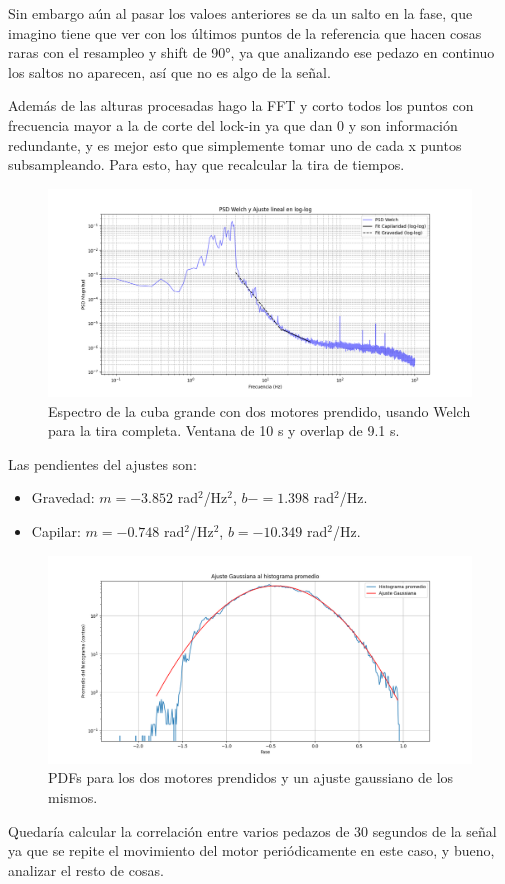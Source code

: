 Sin embargo aún al pasar los valoes anteriores se da un salto en la fase, que imagino tiene que ver con los últimos puntos de la referencia que hacen cosas raras con el resampleo y shift de 90°, ya que analizando ese pedazo en continuo los saltos no aparecen, así que no es algo de la señal. 


Además de las alturas procesadas hago la FFT y corto todos los puntos con frecuencia mayor a la de corte del lock-in ya que dan 0 y son información redundante, y es mejor esto que simplemente tomar uno de cada x puntos subsampleando. Para esto, hay que recalcular la tira de tiempos.

\begin{figure}[th!]
	\centering
	\includegraphics[width=0.87\linewidth]{Figures/23_06_2025/Espectro_dos_motores_cuba_grande}
	\caption{Espectro de la cuba grande con dos motores prendido, usando Welch para la tira completa. Ventana de 10 s y overlap de 9.1 s.}
	\label{fig:espectrodosmotorescubagrande}
\end{figure}

Las pendientes del ajustes son: 
\begin{itemize}
	\item Gravedad: $m=-3.852$ rad$^2$/Hz$^2$, $b-=1.398$ rad$^2$/Hz. 
	\item Capilar: $m=-0.748$ rad$^2$/Hz$^2$, $b=-10.349$ rad$^2$/Hz.
\end{itemize}

\begin{figure}[th!]
	\centering
	\includegraphics[width=0.87\linewidth]{Figures/23_06_2025/PDFS_dos_motores_cuba_grande}
	\caption{PDFs para los dos motores prendidos y un ajuste gaussiano de los mismos.}
	\label{fig:pdfsdosmotorescubagrande}
\end{figure}

Quedaría calcular la correlación entre varios pedazos de 30 segundos de la señal ya que se repite el movimiento del motor periódicamente en este caso, y bueno, analizar el resto de cosas. %

